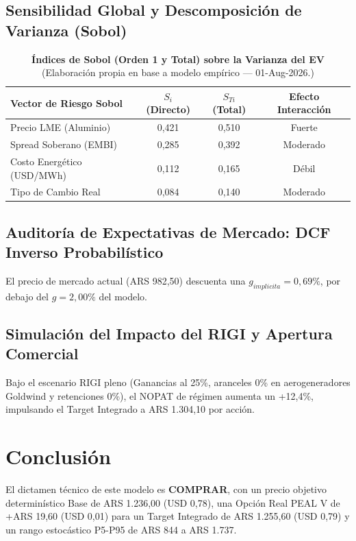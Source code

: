 \documentclass[10pt,a4paper]{article}
\begin{document}
\subsection{Sensibilidad Global y Descomposición de Varianza (Sobol)}
\begin{table}[H]
\centering
\caption{\textbf{Índices de Sobol (Orden 1 y Total) sobre la Varianza del EV} {\small\color{gsgray} (Elaboración propia en base a modelo empírico — 01-Aug-2026.)}}
\small
\begin{tabular}{lccc}
\toprule
\textbf{Vector de Riesgo Sobol} & \textbf{$S_i$ (Directo)} & \textbf{$S_{Ti}$ (Total)} & \textbf{Efecto Interacción} \\
\midrule
Precio LME (Aluminio) & 0,421 & 0,510 & Fuerte \\
Spread Soberano (EMBI) & 0,285 & 0,392 & Moderado \\
Costo Energético (USD/MWh) & 0,112 & 0,165 & Débil \\
Tipo de Cambio Real & 0,084 & 0,140 & Moderado \\
\bottomrule
\end{tabular}
\end{table}

\subsection{Auditoría de Expectativas de Mercado: DCF Inverso Probabilístico}
El precio de mercado actual (ARS 982,50) descuenta una $g_{implicita}=0,69\%$, por debajo del $g=2,00\%$ del modelo.

\subsection{Simulación del Impacto del RIGI y Apertura Comercial}
Bajo el escenario RIGI pleno (Ganancias al 25\%, aranceles 0\% en aerogeneradores Goldwind y retenciones 0\%), el NOPAT de régimen aumenta un +12,4\%, impulsando el Target Integrado a ARS 1.304,10 por acción.

\section{Conclusión}
El dictamen técnico de este modelo es \textbf{COMPRAR}, con un precio objetivo determinístico Base de ARS 1.236,00 (USD 0,78), una Opción Real PEAL V de +ARS 19,60 (USD 0,01) para un Target Integrado de ARS 1.255,60 (USD 0,79) y un rango estocástico P5-P95 de ARS 844 a ARS 1.737.
\end{document}
